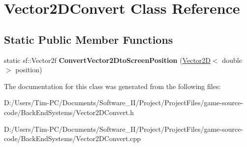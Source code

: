 \hypertarget{class_vector2_d_convert}{}\section{Vector2\+D\+Convert Class Reference}
\label{class_vector2_d_convert}
\subsection*{Static Public Member Functions}
\begin{DoxyCompactItemize}
\item 
\mbox{\label{class_vector2_d_convert_aa4aff52a3a85d4b7da4123e7b73d2d24}} 
static sf\+::\+Vector2f {\bfseries Convert\+Vector2\+Dto\+Screen\+Position} (\hyperlink{class_vector2_d}{Vector2D}$<$ double $>$ position)
\end{DoxyCompactItemize}


The documentation for this class was generated from the following files\+:\begin{DoxyCompactItemize}
\item 
D\+:/\+Users/\+Tim-\/\+P\+C/\+Documents/\+Software\+\_\+\+I\+I/\+Project/\+Project\+Files/game-\/source-\/code/\+Back\+End\+Systems/Vector2\+D\+Convert.\+h\item 
D\+:/\+Users/\+Tim-\/\+P\+C/\+Documents/\+Software\+\_\+\+I\+I/\+Project/\+Project\+Files/game-\/source-\/code/\+Back\+End\+Systems/Vector2\+D\+Convert.\+cpp\end{DoxyCompactItemize}
